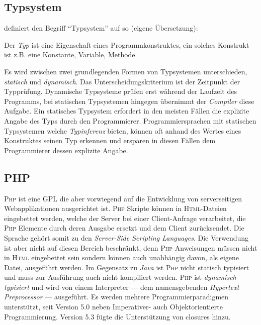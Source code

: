 \subsection{Typsystem}
\label{sec:typesystem}

\citeauthor{voelterDSLEngineering} definiert den Begriff \enquote{Typsystem} auf \cite[][S. 253]{voelterDSLEngineering} so (eigene Übersetzung):


Der \emph{Typ} ist eine Eigenschaft eines Programmkonstruktes, ein solches Konstrukt ist z.B. eine Konstante, Variable, Methode.

Es wird zwischen zwei grundlegenden Formen von Typsystemen unterschieden, \emph{statisch} und \emph{dynamisch}. Das Unterscheidungskriterium ist der Zeitpunkt der Typprüfung. Dynamische Typsysteme prüfen erst während der Laufzeit des Programms, bei statischen Typsystemen hingegen übernimmt der \emph{Compiler} diese Aufgabe. Ein statisches Typsystem erfordert in den meisten Fällen die explizite Angabe des Typs durch den Programmierer. Programmiersprachen mit statischen Typsystemen welche \emph{Typinferenz} bieten, können oft anhand des Wertes eines Konstruktes seinen Typ erkennen und ersparen in diesen Fällen dem Programmierer dessen explizite Angabe.

\subsection{PHP}
\label{sec:php}

\textsc{Php} ist eine \gls{GPL} die aber vorwiegend auf die Entwicklung von serverseitigen Webapplikationen ausgerichtet ist. \textsc{Php} Skripte können in \textsc{Html}-Dateien eingebettet werden, welche der Server bei einer Client-Anfrage verarbeitet, die \textsc{Php} Elemente durch deren Ausgabe ersetzt und dem Client zurücksendet. Die Sprache gehört somit zu den \emph{Server-Side Scripting Languages}. Die Verwendung ist aber nicht auf diesen Bereich beschränkt, denn \textsc{Php} Anweisungen müssen nicht in \textsc{Html} eingebettet sein sondern können auch unabhängig davon, als eigene Datei, ausgeführt werden.
Im Gegensatz zu \emph{Java} ist \textsc{Php} nicht statisch typisiert und muss zur Ausführung auch nicht kompiliert werden. \textsc{Php} ist \emph{dynamisch typisiert} und wird von einem Interpreter --- dem namensgebenden \emph{Hypertext Preprocessor} --- ausgeführt.
Es werden mehrere Programmierparadigmen unterstützt, seit Version 5.0 neben Imperativer- auch Objektorientierte Programmierung. Version 5.3 fügte die Unterstützung von \glspl{closure} hinzu.

